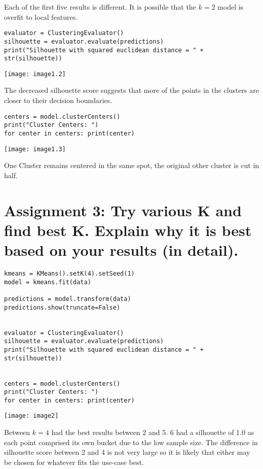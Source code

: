 \documentclass[]{article}
\begin{document}
Each of the first five results is different. It is possible that the $k=2$ model is overfit to local features.

\begin{verbatim}
evaluator = ClusteringEvaluator()
silhouette = evaluator.evaluate(predictions)
print("Silhouette with squared euclidean distance = " + str(silhouette)) 
\end{verbatim}
\texttt{[image: image1.2]}

The decreased silhouette score suggests that more of the points in the clusters are closer to their decision boundaries. 

\begin{verbatim}
centers = model.clusterCenters()
print("Cluster Centers: ")
for center in centers: print(center)
\end{verbatim}
\texttt{[image: image1.3]}

One Cluster remains centered in the same spot, the original other cluster is cut in half.

\section*{Assignment 3: Try various K and find best K. Explain why it is best based on your results (in detail).}

\vspace{-0.75em}
\begin{verbatim}
kmeans = KMeans().setK(4).setSeed(1)
model = kmeans.fit(data)

predictions = model.transform(data)
predictions.show(truncate=False)


evaluator = ClusteringEvaluator()
silhouette = evaluator.evaluate(predictions)
print("Silhouette with squared euclidean distance = " + str(silhouette)) 


centers = model.clusterCenters()
print("Cluster Centers: ")
for center in centers: print(center)
\end{verbatim}
\texttt{[image: image2]}

Between $k=4$ had the best results between 2 and 5. 6 had a silhouette of 1.0 as each point comprised its own bucket due to the low sample size.
The difference in silhouette score between 2 and 4 is not very large so it is likely that either may be chosen for whatever fits the use-case best. 
\end{document}
